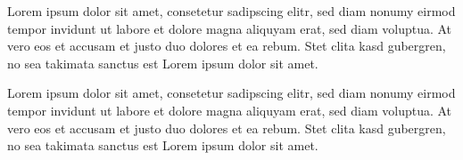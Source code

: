 \begin{note}
  Lorem ipsum dolor sit amet, consetetur sadipscing elitr, sed diam nonumy
  eirmod tempor invidunt ut labore et dolore magna aliquyam erat, sed diam
  voluptua. At vero eos et accusam et justo duo dolores et ea rebum. Stet clita
  kasd gubergren, no sea takimata sanctus est Lorem ipsum dolor sit amet.
\end{note}


\begin{todo}
  Lorem ipsum dolor sit amet, consetetur sadipscing elitr, sed diam nonumy
  eirmod tempor invidunt ut labore et dolore magna aliquyam erat, sed diam
  voluptua. At vero eos et accusam et justo duo dolores et ea rebum. Stet clita
  kasd gubergren, no sea takimata sanctus est Lorem ipsum dolor sit amet.
\end{todo}

